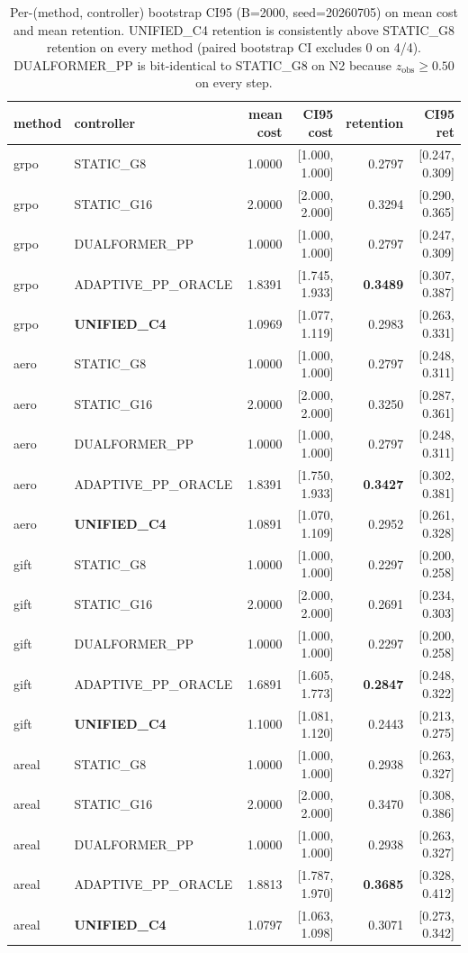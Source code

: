\documentclass{article}
\begin{document}
\begin{table}[ht]
\centering
\small
\begin{tabular}{llrrrr}
\toprule
method & controller & mean cost & CI95 cost & retention & CI95 ret \\
\midrule
grpo   & STATIC\_G8          & 1.0000 & [1.000, 1.000] & 0.2797 & [0.247, 0.309] \\
grpo   & STATIC\_G16         & 2.0000 & [2.000, 2.000] & 0.3294 & [0.290, 0.365] \\
grpo   & DUALFORMER\_PP      & 1.0000 & [1.000, 1.000] & 0.2797 & [0.247, 0.309] \\
grpo   & ADAPTIVE\_PP\_ORACLE & 1.8391 & [1.745, 1.933] & \textbf{0.3489} & [0.307, 0.387] \\
grpo   & \textbf{UNIFIED\_C4} & 1.0969 & [1.077, 1.119] & 0.2983 & [0.263, 0.331] \\
\midrule
aero   & STATIC\_G8          & 1.0000 & [1.000, 1.000] & 0.2797 & [0.248, 0.311] \\
aero   & STATIC\_G16         & 2.0000 & [2.000, 2.000] & 0.3250 & [0.287, 0.361] \\
aero   & DUALFORMER\_PP      & 1.0000 & [1.000, 1.000] & 0.2797 & [0.248, 0.311] \\
aero   & ADAPTIVE\_PP\_ORACLE & 1.8391 & [1.750, 1.933] & \textbf{0.3427} & [0.302, 0.381] \\
aero   & \textbf{UNIFIED\_C4} & 1.0891 & [1.070, 1.109] & 0.2952 & [0.261, 0.328] \\
\midrule
gift   & STATIC\_G8          & 1.0000 & [1.000, 1.000] & 0.2297 & [0.200, 0.258] \\
gift   & STATIC\_G16         & 2.0000 & [2.000, 2.000] & 0.2691 & [0.234, 0.303] \\
gift   & DUALFORMER\_PP      & 1.0000 & [1.000, 1.000] & 0.2297 & [0.200, 0.258] \\
gift   & ADAPTIVE\_PP\_ORACLE & 1.6891 & [1.605, 1.773] & \textbf{0.2847} & [0.248, 0.322] \\
gift   & \textbf{UNIFIED\_C4} & 1.1000 & [1.081, 1.120] & 0.2443 & [0.213, 0.275] \\
\midrule
areal  & STATIC\_G8          & 1.0000 & [1.000, 1.000] & 0.2938 & [0.263, 0.327] \\
areal  & STATIC\_G16         & 2.0000 & [2.000, 2.000] & 0.3470 & [0.308, 0.386] \\
areal  & DUALFORMER\_PP      & 1.0000 & [1.000, 1.000] & 0.2938 & [0.263, 0.327] \\
areal  & ADAPTIVE\_PP\_ORACLE & 1.8813 & [1.787, 1.970] & \textbf{0.3685} & [0.328, 0.412] \\
areal  & \textbf{UNIFIED\_C4} & 1.0797 & [1.063, 1.098] & 0.3071 & [0.273, 0.342] \\
\bottomrule
\end{tabular}
\caption{Per-(method, controller) bootstrap CI95 (B=2000, seed=20260705) on
mean cost and mean retention. UNIFIED\_C4 retention is consistently above
STATIC\_G8 retention on every method (paired bootstrap CI excludes 0 on 4/4).
DUALFORMER\_PP is bit-identical to STATIC\_G8 on N2 because $z_{\mathrm{obs}} \geq 0.50$ on every step.}
\label{tab:p7-iter159-per-method-ci}
\end{table}
\end{document}
